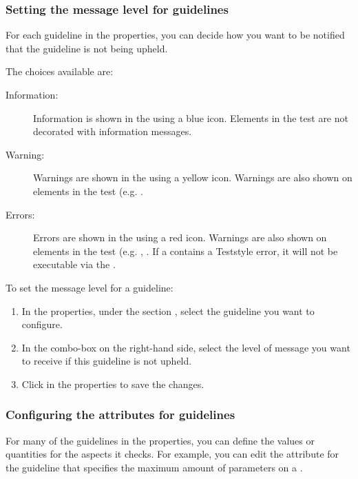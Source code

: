\subsubsection{Setting the message level for guidelines}
\label{TeststyleMessageLevel}

For each guideline in the \gdproject{} properties, you can decide how you want to be notified that the guideline is not being upheld. 

The choices available are:
\begin{description}
\item [Information:]{Information is shown in the \gdprobview{} using a blue icon. Elements in the test are not decorated with information messages.}
\item [Warning:]{Warnings are shown in the \gdprobview{} using a yellow icon. Warnings are also shown on elements in the test (e.g. \gdcases{}.}
\item[Errors:]{Errors are shown in the \gdprobview{} using a red icon. Warnings are also shown on elements in the test (e.g. \gdcases{}, \gdsuites{}. If a \gdsuite{} contains a Teststyle error, it will not be executable via the \ite{}.}
\end{description}

To set the message level for a guideline:
\begin{enumerate}
\item In the \gdproject{} properties, under the section , select the guideline you want to configure.
\item In the combo-box on the right-hand side, select the level of message you want to receive if this guideline is not upheld.
\item Click  in the \gdproject{} properties to save the changes. 
\end{enumerate}

\subsubsection{Configuring the attributes for guidelines}
\label{TeststyleAttributes}

For many of the guidelines in the \gdproject{} properties, you can define the values or quantities for the aspects it checks. For example, you can edit the attribute  for the guideline that specifies the maximum amount of parameters on a \gdcase{}. 

